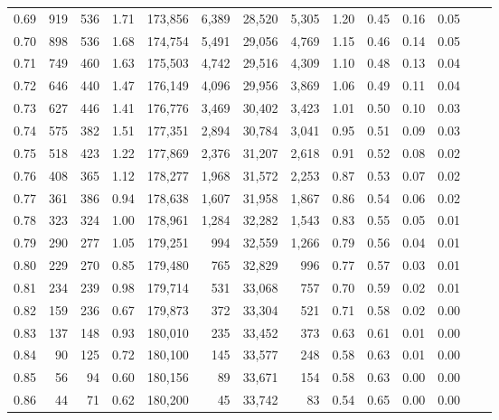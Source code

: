 \begin{tabular}{rrrrrrrrrrrrrr}
0.69 &    919 &  536 &    1.71 &  173,856 &    6,389 &  28,520 &   5,305 &  1.20 &  0.45 &  0.16 &      0.05 \\
0.70 &    898 &  536 &    1.68 &  174,754 &    5,491 &  29,056 &   4,769 &  1.15 &  0.46 &  0.14 &      0.05 \\
0.71 &    749 &  460 &    1.63 &  175,503 &    4,742 &  29,516 &   4,309 &  1.10 &  0.48 &  0.13 &      0.04 \\
0.72 &    646 &  440 &    1.47 &  176,149 &    4,096 &  29,956 &   3,869 &  1.06 &  0.49 &  0.11 &      0.04 \\
0.73 &    627 &  446 &    1.41 &  176,776 &    3,469 &  30,402 &   3,423 &  1.01 &  0.50 &  0.10 &      0.03 \\
0.74 &    575 &  382 &    1.51 &  177,351 &    2,894 &  30,784 &   3,041 &  0.95 &  0.51 &  0.09 &      0.03 \\
0.75 &    518 &  423 &    1.22 &  177,869 &    2,376 &  31,207 &   2,618 &  0.91 &  0.52 &  0.08 &      0.02 \\
0.76 &    408 &  365 &    1.12 &  178,277 &    1,968 &  31,572 &   2,253 &  0.87 &  0.53 &  0.07 &      0.02 \\
0.77 &    361 &  386 &    0.94 &  178,638 &    1,607 &  31,958 &   1,867 &  0.86 &  0.54 &  0.06 &      0.02 \\
0.78 &    323 &  324 &    1.00 &  178,961 &    1,284 &  32,282 &   1,543 &  0.83 &  0.55 &  0.05 &      0.01 \\
0.79 &    290 &  277 &    1.05 &  179,251 &      994 &  32,559 &   1,266 &  0.79 &  0.56 &  0.04 &      0.01 \\
0.80 &    229 &  270 &    0.85 &  179,480 &      765 &  32,829 &     996 &  0.77 &  0.57 &  0.03 &      0.01 \\
0.81 &    234 &  239 &    0.98 &  179,714 &      531 &  33,068 &     757 &  0.70 &  0.59 &  0.02 &      0.01 \\
0.82 &    159 &  236 &    0.67 &  179,873 &      372 &  33,304 &     521 &  0.71 &  0.58 &  0.02 &      0.00 \\
0.83 &    137 &  148 &    0.93 &  180,010 &      235 &  33,452 &     373 &  0.63 &  0.61 &  0.01 &      0.00 \\
0.84 &     90 &  125 &    0.72 &  180,100 &      145 &  33,577 &     248 &  0.58 &  0.63 &  0.01 &      0.00 \\
0.85 &     56 &   94 &    0.60 &  180,156 &       89 &  33,671 &     154 &  0.58 &  0.63 &  0.00 &      0.00 \\
0.86 &     44 &   71 &    0.62 &  180,200 &       45 &  33,742 &      83 &  0.54 &  0.65 &  0.00 &      0.00 \\

\end{tabular}
